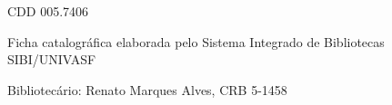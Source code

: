 \begin{fichacatalografica}
\begin{center}
{\begin{minipage}[t][7.5cm][t]{12.5cm}
\begin{minipage}[t][7.5cm][t]{11.5cm}
			\vspace{-0.5cm}
			\center
			\hspace{-1.0cm} CDD 005.7406%
			\end{minipage}
		\end{minipage}
	}
	\end{center}
	\vspace{-1.0cm}
	\center
	\scriptsize Ficha catalográfica elaborada pelo Sistema Integrado de Bibliotecas SIBI/UNIVASF

	\vspace{-0.5cm}
	\center \scriptsize Bibliotecário: Renato Marques Alves, CRB 5-1458
	
\end{fichacatalografica}